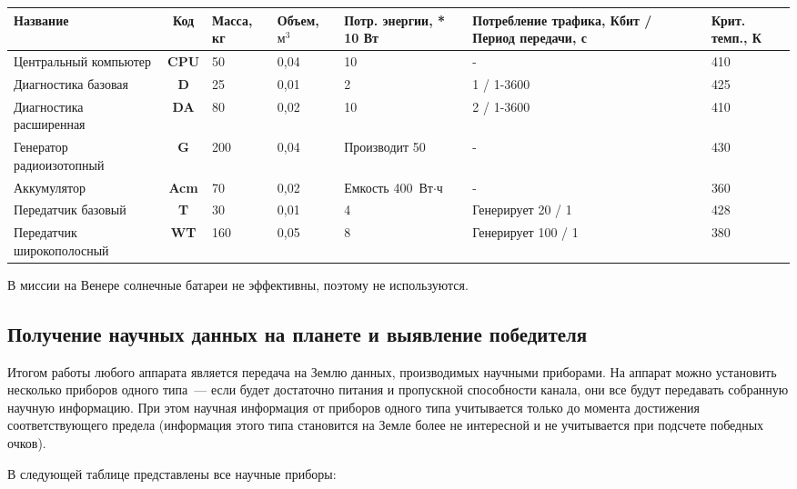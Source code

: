 \documentclass[12pt,a4paper]{article}
\begin{document}
\begin{center}
\begin{tabular}{ |p{3cm}|c|p{1.5cm}|p{1.5cm}|p{2.5cm}|p{3cm}|p{1.5cm}| } 
  \hline
  \textbf{Название} & \textbf{Код} & \textbf{Масса, кг} & \textbf{Объем, $\text{м}^3$} &
  \textbf{Потр. энергии, * 10 Вт} & \textbf{Потребление трафика, Кбит / Период передачи,
    с} & \textbf{Крит. темп., К}\\
  \hline
  Центральный компьютер & \textbf{CPU} & 50 & 0,04 & 10 & - & 410 \\
  \hline
  Диагностика базовая & \textbf{D} & 25 & 0,01 & 2 & 1 / 1-3600 & 425 \\
  \hline
  Диагностика расширенная & \textbf{DA} & 80 & 0,02 & 10 & 2 / 1-3600 & 410\\
  \hline
  Генератор радиоизотопный & \textbf{G} & 200 & 0,04 & Производит 50 & - & 430\\
  \hline
  Аккумулятор & \textbf{Acm} & 70 & 0,02 & Емкость 400 $\text{Вт}\cdot\text{ч}$& - & 360\\
  \hline
  Передатчик базовый & \textbf{T} & 30 & 0,01 & 4 & Генерирует 20 / 1 & 428\\
  \hline
  Передатчик широкополосный & \textbf{WT} & 160 & 0,05 & 8 & Генерирует 100 / 1 & 380\\
  \hline
\end{tabular}
\end{center}

В миссии на Венере солнечные батареи не эффективны, поэтому не используются.

\subsection{Получение научных данных на планете и выявление победителя}

Итогом работы любого аппарата является передача на Землю данных, производимых научными
приборами. На аппарат можно установить несколько приборов одного типа~--- если будет
достаточно питания и пропускной способности канала, они все будут передавать собранную
научную информацию. При этом научная информация от приборов одного типа учитывается только
до момента достижения соответствующего предела (информация этого типа становится на Земле
более не интересной и не учитывается при подсчете победных очков).

В следующей таблице представлены все научные приборы:
\end{document}
